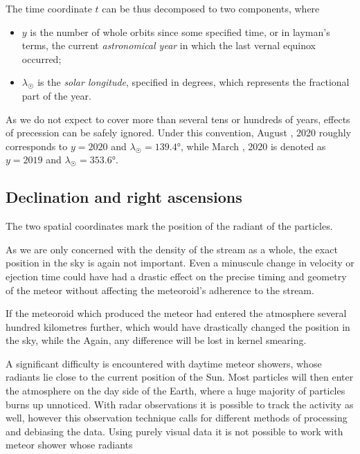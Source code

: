         The time coordinate $t$ can be thus decomposed to two components,
        where
        \begin{itemize}
            \item $y$ is the number of whole orbits since some specified time, or in layman's terms, the current \emph{astronomical year} in which
                the last vernal equinox occurred;
            \item $\lambda_\Sun$ is the \emph{solar longitude}, specified in degrees, which represents the fractional part of the year.
        \end{itemize}

        As we do not expect to cover more than several tens or hundreds of years, effects of precession can be safely ignored.
        Under this convention, August , 2020 roughly corresponds to $y = 2020$ and $\lambda_\Sun = \ang{139.4}$,
        while March , 2020 is denoted as $y = 2019$ and $\lambda_\Sun = \ang{353.6}$.

    \subsection{Declination and right ascensions} \label{ios}
        The two spatial coordinates mark the position of the radiant of the particles.

        As we are only concerned with the density of the stream as a whole,
        the exact position in the sky is again not important.
        Even a minuscule change in velocity or ejection time could have had a drastic effect
        on the precise timing and geometry of the meteor without affecting the meteoroid's
        adherence to the stream.

        If the meteoroid which produced the meteor
        had entered the atmosphere several hundred kilometres further,
        which would have drastically changed the position in the sky, while the
        Again, any difference will be lost in kernel smearing.

        A significant difficulty is encountered with daytime meteor showers, whose radiants
        lie close to the current position of the Sun.
        Most particles will then enter the atmosphere on the day side
        of the Earth, where a huge majority of particles burns up unnoticed.
        With radar observations it is possible to track the activity as well,
        however this observation technique calls for different methods of processing and debiasing the data.
        Using purely visual data it is not possible to work with meteor shower whose radiants



